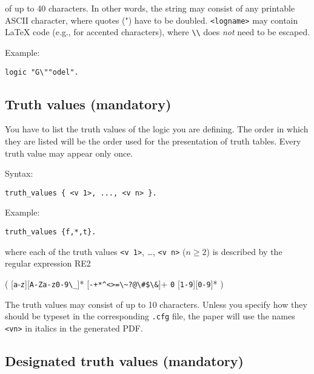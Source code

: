 \documentclass[
]{article}
\newcommand{\passthrough}[1]{#1}
\begin{document}
of up to 40 characters. In other words, the string may consist of any
printable ASCII character, where quotes (") have to be doubled.
\passthrough{\lstinline!<logname>!} may contain LaTeX code (e.g., for
accented characters), where \passthrough{\lstinline!\\!} does \emph{not}
need to be escaped.

Example:

\begin{lstlisting}
logic "G\""odel".
\end{lstlisting}

\hypertarget{truth-values-mandatory}{%
\subsection{Truth values (mandatory)}\label{truth-values-mandatory}}

You have to list the truth values of the logic you are defining. The
order in which they are listed will be the order used for the
presentation of truth tables. Every truth value may appear only once.

Syntax:

\begin{lstlisting}
truth_values { <v 1>, ..., <v n> }.
\end{lstlisting}

Example:

\begin{lstlisting}
truth_values {f,*,t}.
\end{lstlisting}

where each of the truth values \passthrough{\lstinline!<v 1>!}, \ldots,
\passthrough{\lstinline!<v n>!} (\(n \ge 2\)) is described by the
regular expression RE2

(
{[}\passthrough{\lstinline!a!}-\passthrough{\lstinline!z!}{]}{[}\passthrough{\lstinline!A-Za-z0-9\_!}{]}*
\textbar{} {[}\passthrough{\lstinline!-+*^<>=\~?@\#$\&!}{]}+ \textbar{}
\passthrough{\lstinline!0!} \textbar{}
{[}\passthrough{\lstinline!1-9!}{]}{[}\passthrough{\lstinline!0-9!}{]}*
)

The truth values may consist of up to 10 characters. Unless you specify
how they should be typeset in the corresponding
\passthrough{\lstinline!.cfg!} file, the paper will use the names
\passthrough{\lstinline!<vn>!} in italics in the generated PDF.

\hypertarget{designated-truth-values-mandatory}{%
\subsection{Designated truth values
(mandatory)}\label{designated-truth-values-mandatory}}
\end{document}
